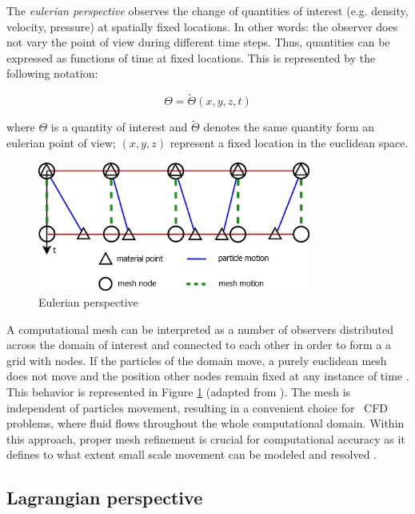 The \textit{eulerian perspective} observes the change of quantities of interest (e.g. density, velocity, pressure) at spatially fixed locations. In other words: the observer does not vary the point of view during different time steps. Thus, quantities can be expressed as functions of time at fixed locations. 
This is represented by the following notation:

\begin{equation}
	\Theta = \tilde{\Theta}(x,y,z,t)
	\label{eq:eulerian}
\end{equation}

where $\Theta$ is a quantity of interest and $\tilde{\Theta}$ denotes the same quantity form an eulerian point of view; $(x, y, z)$ represent a fixed location in the euclidean space.


\begin{figure}[htbp!]
	\centering
	\includegraphics[width=0.8\textwidth]{images/eulerian}
	\caption{Eulerian perspective}
	\label{fig:eulerian}
\end{figure}

A computational mesh can be interpreted as a number of observers distributed across the domain of interest and connected to each other in order to form a a grid with nodes. If the particles of the domain move, a purely euclidean mesh does not move and the position other nodes remain fixed at any instance of time \cite{Cheng2006SlidingFL}. 
This behavior is represented in Figure \ref{fig:eulerian} (adapted from \cite{Cheng2006SlidingFL}). The mesh is independent of particles movement, resulting in a convenient choice for ~\ac{CFD} problems, where fluid flows throughout the whole
computational domain. Within this approach, proper mesh refinement is crucial for computational accuracy as it defines to what extent small scale movement can be modeled and resolved \cite{donea2017arbitrary}.

\subsection{Lagrangian perspective}
\label{subsec:lagrange}

